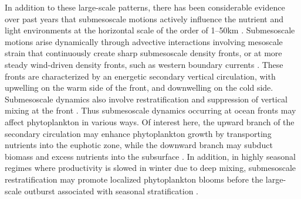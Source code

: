 In addition to these large-scale patterns, there has been considerable evidence over past years that submesoscale motions actively influence the nutrient and light environments at the horizontal scale of the order of 1--50km \parencite[see reviews by][]{levy_2012, mahadevan_2016, levy_2018}.
Submesoscale motions arise dynamically through advective interactions involving mesoscale strain that continuously create sharp submesoscale density fronts, or at more steady wind-driven density fronts, such as western boundary currents \parencite{thomas_2008, mcwilliams_2016, mahadevan_2020}.
These fronts are characterized by an energetic secondary vertical circulation, with upwelling on the warm side of the front, and downwelling on the cold side.
Submesoscale dynamics also involve restratification and suppression of vertical mixing at the front \parencite{thomas_2008a}.
Thus submesoscale dynamics occurring at ocean fronts may affect phytoplankton in various ways.
Of interest here, the upward branch of the secondary circulation may enhance phytoplankton growth by transporting nutrients into the euphotic zone, while the downward branch may subduct biomass and excess nutrients into the subsurface \parencite{calil_2011, omand_2015, hauschildt_2021}.
In addition, in highly seasonal regimes where productivity is slowed in winter due to deep mixing, submesoscale restratification may promote localized phytoplankton blooms before the large-scale outburst associated with seasonal stratification \parencite{mahadevan_2012}.

